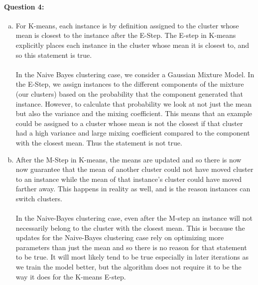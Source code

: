 \documentclass[letterpaper,11pt]{article}
\begin{document}
\paragraph{Question 4:}
\begin{enumerate}[(a)]
    \item
        For K-means, each instance is by definition assigned to the cluster
        whose mean is closest to the instance after the E-Step. The E-step in
        K-means explicitly places each instance in the cluster whose mean
        it is closest to, and so this statement is true.\\
        \\
        In the Naive Bayes clustering case, we consider a Gaussian Mixture
        Model. In the E-Step, we assign instances to the different components
        of the mixture (our clusters) based on the probability that the component
        generated that instance. However, to calculate that probability we look
        at not just the mean but also the variance and the mixing coefficient. This means
        that an example could be assigned to a cluster whose mean is not the closest if
        that cluster had a high variance and large mixing coefficient compared
        to the component with the closest mean. Thus the statement is not true.
    \item
        After the M-Step in K-means, the means are updated and so there is now
        now guarantee that the mean of another cluster could not have moved
        cluster to an instance while the mean of that instance's cluster
        could have moved farther away. This happens in reality as well, and
        is the reason instances can switch clusters.\\
        \\
        In the Naive-Bayes clustering case, even after the M-step an instance
        will not necessarily belong to the cluster with the closest mean. This
        is because the updates for the Naive-Bayes clustering case rely on
        optimizing more parameters than just the mean and so there is no reason
        for that statement to be true. It will most likely tend to be true
        especially in later iterations as we train the model better, but the
        algorithm does not require it to be the way it does for the K-means E-step.


\end{enumerate}
\end{document}
